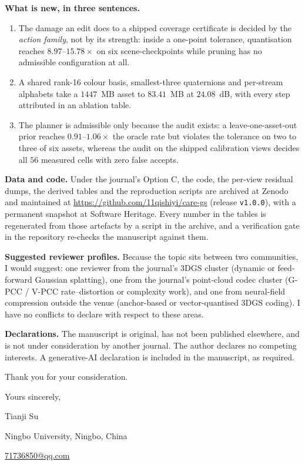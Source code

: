 \documentclass[11pt]{article}
\begin{document}
\textbf{What is new, in three sentences.}
\begin{enumerate}\setlength{\itemsep}{1pt}
  \item The damage an edit does to a shipped coverage certificate is decided by the \emph{action family}, not by its
        strength: inside a one-point tolerance, quantisation reaches $8.97$--$15.78\times$ on six scene-checkpoints
        while pruning has no admissible configuration at all.
  \item A shared rank-16 colour basis, smallest-three quaternions and per-stream alphabets take a $1447$~MB asset to
        $83.41$~MB at $24.08$~dB, with every step attributed in an ablation table.
  \item The planner is admissible only because the audit exists: a leave-one-asset-out prior reaches
        $0.91$--$1.06\times$ the oracle rate but violates the tolerance on two to three of six assets, whereas the
        audit on the shipped calibration views decides all $56$ measured cells with zero false accepts.
\end{enumerate}

\textbf{Data and code.} Under the journal's Option C, the code, the per-view residual dumps, the derived tables and the
reproduction scripts are archived at Zenodo and maintained at
\url{https://github.com/11qishiyi/care-gs} (release \texttt{v1.0.0}), with a permanent snapshot at Software Heritage.
Every number in the tables is regenerated from those artefacts by a script in the archive, and a verification gate in
the repository re-checks the manuscript against them.

\textbf{Suggested reviewer profiles.} Because the topic sits between two communities, I would suggest: one reviewer
from the journal's 3DGS cluster (dynamic or feed-forward Gaussian splatting), one from the journal's point-cloud codec
cluster (G-PCC / V-PCC rate--distortion or complexity work), and one from neural-field compression outside the venue
(anchor-based or vector-quantised 3DGS coding). I have no conflicts to declare with respect to these areas.

\textbf{Declarations.} The manuscript is original, has not been published elsewhere, and is not under consideration by
another journal. The author declares no competing interests. A generative-AI declaration is included in the
manuscript, as required.

Thank you for your consideration.

\medskip
Yours sincerely,\par
Tianji Su\par
Ningbo University, Ningbo, China\par
\url{71736850@qq.com}
\end{document}
